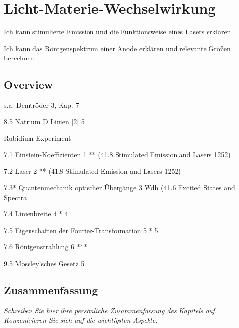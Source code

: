 \renewcommand{\lastmod}{10. September 2024}
\renewcommand{\chapterauthors}{Markus Lippitz}

\chapter{Licht-Materie-Wechselwirkung}




Ich kann stimulierte Emission und die Funktionsweise eines Lasers erklären.

Ich kann das Röntgenspektrum einer Anode erklären und relevante Größen berechnen.


\section{Overview}

s.a. Demtröder 3, Kap. 7

8.5 Natrium D Linien [2] 5


Rubidium Experiment


 
7.1 Einstein-Koeffizienten 1	** (41.8 Stimulated Emission and Lasers 1252)


7.2 Laser 2	** (41.8 Stimulated Emission and Lasers 1252)

7.3* Quantenmechanik optischer Übergänge 3	Wdh (41.6 Excited States and Spectra

7.4 Linienbreite 4	*	4 

7.5 Eigenschaften der Fourier-Transformation 5	*	5 

7.6 Röntgenstrahlung 6	***	

9.5 Moseley’sches Gesetz 5	





\section{Zusammenfassung}

\textit{Schreiben Sie hier ihre persönliche Zusammenfassung des Kapitels auf. Konzentrieren Sie sich auf die wichtigsten Aspekte.}

\vspace*{10cm}


\printbibliography[segment=\therefsegment,heading=subbibliography]
